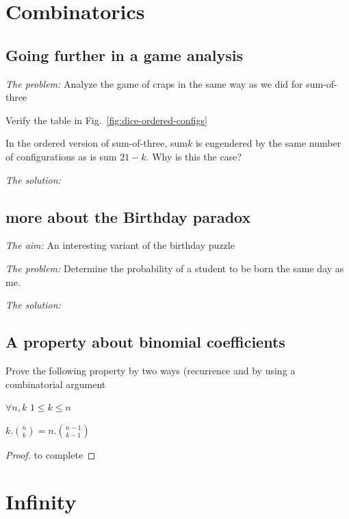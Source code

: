 \section{Combinatorics}

\subsection{Going further in a game analysis}

\noindent \textit{The problem:}
Analyze the game of craps in the same way as we did for sum-of-three

Verify the table in Fig.~\ref{fig:dice-ordered-configs}

In the ordered version of sum-of-three, sum$k$ is engendered by the
same number of configurations as is sum $21 - k$.  
Why is this the case?

\noindent \textit{The solution:}

\subsection{more about the Birthday paradox}

\noindent \textit{The aim:}
An interesting variant of the birthday puzzle
\medskip

\noindent \textit{The problem:}
Determine the
probability of a student to be born the same day as me.
\medskip

\noindent \textit{The solution:}


\subsection{A property about binomial coefficients}

Prove the following property by two ways (recurrence and by using a combinatorial argument
\begin{prop}
$\forall n,k$ $1 \leq k \leq n$

$k.{n \choose k} = n.{{n-1} \choose {k-1}}$
\end{prop}

\begin{proof}
to complete
\end{proof}




\section{Infinity}

